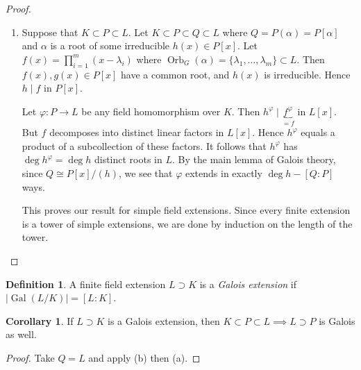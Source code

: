 \documentclass[10pt,letterpaper,cm]{nupset}
\theoremstyle{definition}
\newtheorem*{definition}{Definition}
\newtheorem{corollary}{Corollary}
\newtheorem{lemma}{Lemma}
\newcommand{\1}{\mathbf{1}}
\newcommand{\0}{\vec 0}
\DeclareMathOperator{\gal}{Gal}
\DeclareMathOperator{\orb}{Orb}
\begin{document}
\begin{proof}
\begin{enumerate}[label=(\alph*)]
We have shown that $L = \bigcup_{g\in G} L_g$.
\begin{lemma}
If $K$ is an infinite field and $V$ is a finite-dimensional $K$-vector space and $V_1, V_2, \ldots, V_g \subset V$ are subspaces, then $V= \bigcup_{i=1}^g V_i \implies V = V_k$ for some $k$.
\end{lemma}
\begin{proof}
Suppose that each $V_i \subsetneq V$ and that $V= \bigcup_{i=1}^g V_i $. Then there exists a linear map $f_i : V \to K$ such that $f_i \restriction_{V_i} =0$ and $f_i \ne 0$. Then $f: V \to K$ given by $f = \prod_{i=1}^kf_i$ is the function associates with a nonzero polynomial in $V= K^n$ of degree $s$.  But $f$ is the zero function since $V = \bigcup_{i=1}^k V_i$, a contradiction.
\end{proof}
\item  Suppose that $K \subset P \subset L$. Let $K \subset P \subset Q \subset L$ where $Q = P(\alpha) = P[\alpha]$ and $\alpha$ is a root of some irreducible $h(x) \in P[x]$. Let $f(x) = \prod_{i=1}^m (x-\lambda_i)$ where $\orb_G(\alpha) = \{\lambda_1, \ldots, \lambda_m\} \subset L$. Then $f(x), g(x) \in P[x]$ have a common root, and $h(x)$ is irreducible. Hence $h\mid f$ in $P[x]$.

Let $\varphi : P \to L$ be any field homomorphism over $K$.  Then $h^{\varphi}\mid \underbrace{f^{\varphi}}_{=f}$ in $L[x]$. But $f$ decomposes into distinct linear factors in $L[x]$. Hence $h^{\varphi}$ equals a product of a subcollection of these factors.  It follows that $h^{\varphi}$ has $\deg{h^{\varphi}}= \deg{h}$ distinct roots in $L$. By the main lemma of Galois theory, since $Q \cong P[x]/(h)$, we see that $\varphi$ extends in exactly $\deg{h} - [Q:P]$ ways. 

This proves our result for simple field extensions. Since every finite extension is a tower of simple extensions, we are done by induction on the length of the tower. 
\end{enumerate}
\end{proof}

\begin{definition}
A finite field extension $L \supset K$ is a \textit{Galois extension} if $\lvert{\gal(L/K)}\rvert = [L:K]$.
\end{definition}

\begin{corollary}
If $L\supset K$ is a Galois extension, then $K \subset P \subset L \implies L\supset P$ is Galois as well.
\end{corollary}
\begin{proof}
Take $Q= L$ and apply (b) then (a).
\end{proof}
\end{document}
